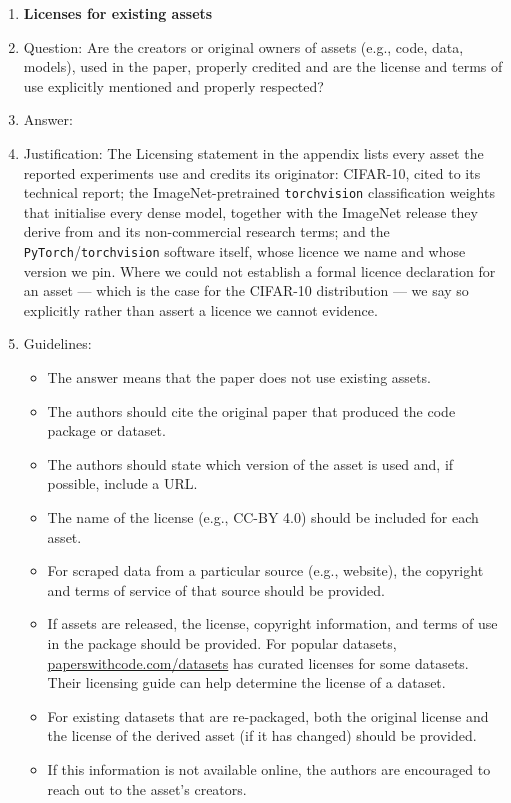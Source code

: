 \begin{enumerate}
\item {\bf Licenses for existing assets}
    \item[] Question: Are the creators or original owners of assets (e.g., code, data, models), used in the paper, properly credited and are the license and terms of use explicitly mentioned and properly respected?
    \item[] Answer: \answerYes{}
    \item[] Justification: The Licensing statement in the appendix lists every asset the reported experiments use and credits its originator: CIFAR-10, cited to its technical report; the ImageNet-pretrained \texttt{torchvision} classification weights that initialise every dense model, together with the ImageNet release they derive from and its non-commercial research terms; and the \texttt{PyTorch}/\texttt{torchvision} software itself, whose licence we name and whose version we pin. Where we could not establish a formal licence declaration for an asset --- which is the case for the CIFAR-10 distribution --- we say so explicitly rather than assert a licence we cannot evidence.
    \item[] Guidelines:
    \begin{itemize}
        \item The answer \answerNA{} means that the paper does not use existing assets.
        \item The authors should cite the original paper that produced the code package or dataset.
        \item The authors should state which version of the asset is used and, if possible, include a URL.
        \item The name of the license (e.g., CC-BY 4.0) should be included for each asset.
        \item For scraped data from a particular source (e.g., website), the copyright and terms of service of that source should be provided.
        \item If assets are released, the license, copyright information, and terms of use in the package should be provided. For popular datasets, \url{paperswithcode.com/datasets} has curated licenses for some datasets. Their licensing guide can help determine the license of a dataset.
        \item For existing datasets that are re-packaged, both the original license and the license of the derived asset (if it has changed) should be provided.
        \item If this information is not available online, the authors are encouraged to reach out to the asset's creators.
    \end{itemize}


\end{enumerate}
